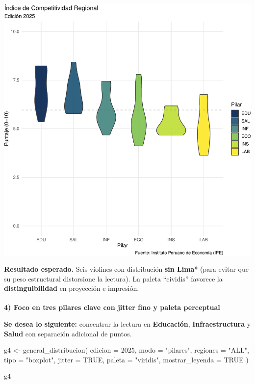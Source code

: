 \documentclass[
  11pt,
  letterpaper,
  DIV=11,
  numbers=noendperiod]{scrartcl}
\makeatletter
\let\oldparagraph\paragraph
\renewcommand{\paragraph}{
    \@ifstar
      \xxxParagraphStar
      \xxxParagraphNoStar
  }
\newcommand{\xxxParagraphStar}[1]{\oldparagraph*{#1}\mbox{}}
\newcommand{\xxxParagraphNoStar}[1]{\oldparagraph{#1}\mbox{}}
\newenvironment{Shaded}{\begin{snugshade}}{\end{snugshade}}
\newcommand{\AttributeTok}[1]{\textcolor[rgb]{0.40,0.45,0.13}{#1}}
\newcommand{\ConstantTok}[1]{\textcolor[rgb]{0.56,0.35,0.01}{#1}}
\newcommand{\DecValTok}[1]{\textcolor[rgb]{0.68,0.00,0.00}{#1}}
\newcommand{\FunctionTok}[1]{\textcolor[rgb]{0.28,0.35,0.67}{#1}}
\newcommand{\NormalTok}[1]{\textcolor[rgb]{0.00,0.23,0.31}{#1}}
\newcommand{\OtherTok}[1]{\textcolor[rgb]{0.00,0.23,0.31}{#1}}
\newcommand{\StringTok}[1]{\textcolor[rgb]{0.13,0.47,0.30}{#1}}
\makeatother
\begin{document}
\includegraphics{Manual_files/figure-pdf/unnamed-chunk-28-1.pdf}

\textbf{Resultado esperado.} Seis violines con distribución \textbf{sin
Lima}* (para evitar que su peso estructural distorsione la lectura). La
paleta ``cividis'' favorece la \textbf{distinguibilidad} en proyección e
impresión.

\paragraph{\texorpdfstring{\textbf{4) Foco en tres pilares clave con
jitter fino y paleta
perceptual}}{4) Foco en tres pilares clave con jitter fino y paleta perceptual}}\label{foco-en-tres-pilares-clave-con-jitter-fino-y-paleta-perceptual}

\textbf{Se desea lo siguiente:} concentrar la lectura en
\textbf{Educación}, \textbf{Infraestructura} y \textbf{Salud} con
separación adicional de puntos.

\begin{Shaded}
\begin{Highlighting}[]
\NormalTok{g4 }\OtherTok{\textless{}{-}} \FunctionTok{general\_distribucion}\NormalTok{(}
  \AttributeTok{edicion =} \DecValTok{2025}\NormalTok{,}
  \AttributeTok{modo    =} \StringTok{"pilares"}\NormalTok{,}
  \AttributeTok{regiones =} \StringTok{"ALL"}\NormalTok{,}
  \AttributeTok{tipo    =} \StringTok{"boxplot"}\NormalTok{,}
  \AttributeTok{jitter  =} \ConstantTok{TRUE}\NormalTok{,}
  \AttributeTok{paleta  =} \StringTok{"viridis"}\NormalTok{,}
  \AttributeTok{mostrar\_leyenda =} \ConstantTok{TRUE}
\NormalTok{)}

\NormalTok{g4}
\end{Highlighting}
\end{Shaded}
\end{document}
